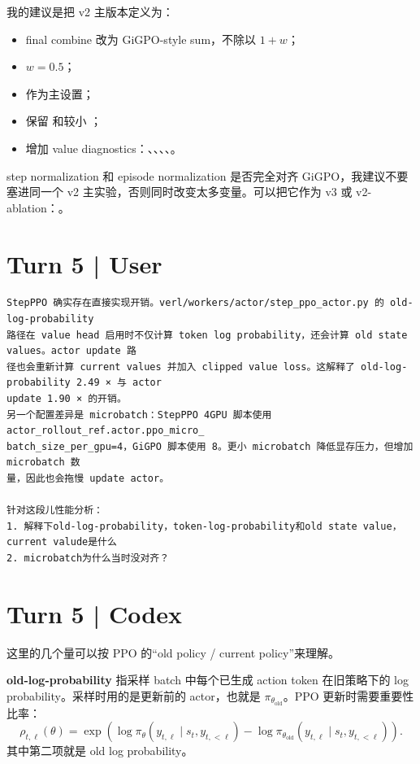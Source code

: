 \documentclass[10pt]{ctexart}
\begin{document}
我的建议是把 v2 主版本定义为：
\begin{itemize}
\item final combine 改为 GiGPO-style sum，不除以 $1+w$；
\item $w=0.5$；
\item {} 作为主设置；
\item 保留  和较小 ；
\item 增加 value diagnostics：、、、、。
\end{itemize}

step normalization 和 episode normalization 是否完全对齐 GiGPO，我建议不要塞进同一个 v2 主实验，否则同时改变太多变量。可以把它作为 v3 或 v2-ablation：。


\section*{Turn 5 | User}
\begin{Verbatim}[breaklines=true,breakanywhere=true]
StepPPO 确实存在直接实现开销。verl/workers/actor/step_ppo_actor.py 的 old-log-probability
路径在 value head 启用时不仅计算 token log probability，还会计算 old state values。actor update 路
径也会重新计算 current values 并加入 clipped value loss。这解释了 old-log-probability 2.49 × 与 actor
update 1.90 × 的开销。
另一个配置差异是 microbatch：StepPPO 4GPU 脚本使用 actor_rollout_ref.actor.ppo_micro_
batch_size_per_gpu=4，GiGPO 脚本使用 8。更小 microbatch 降低显存压力，但增加 microbatch 数
量，因此也会拖慢 update actor。

针对这段儿性能分析：
1. 解释下old-log-probability，token-log-probability和old state value，current valude是什么
2. microbatch为什么当时没对齐？
\end{Verbatim}

\section*{Turn 5 | Codex}
这里的几个量可以按 PPO 的“old policy / current policy”来理解。

\textbf{old-log-probability} 指采样 batch 中每个已生成 action token 在旧策略下的 log probability。采样时用的是更新前的 actor，也就是 $\pi_{\theta_{\mathrm{old}}}$。PPO 更新时需要重要性比率：
\[
\rho_{t,\ell}(\theta)
=
\exp\left(
\log \pi_{\theta}(y_{t,\ell}\mid s_t,y_{t,<\ell})
-
\log \pi_{\theta_{\mathrm{old}}}(y_{t,\ell}\mid s_t,y_{t,<\ell})
\right).
\]
其中第二项就是 old log probability。
\end{document}
